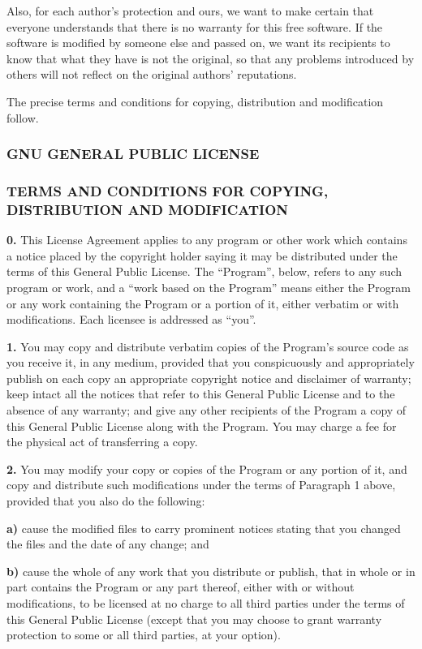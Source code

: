 \documentclass[]{article}
\begin{document}
Also, for each author's protection and ours, we want to make certain
that everyone understands that there is no warranty for this free
software. If the software is modified by someone else and passed on, we
want its recipients to know that what they have is not the original, so
that any problems introduced by others will not reflect on the original
authors' reputations.

The precise terms and conditions for copying, distribution and
modification follow.

\subsubsection{GNU GENERAL PUBLIC LICENSE}

\subsubsection{TERMS AND CONDITIONS FOR COPYING, DISTRIBUTION AND
MODIFICATION}

\textbf{0.} This License Agreement applies to any program or other work
which contains a notice placed by the copyright holder saying it may be
distributed under the terms of this General Public License. The
``Program'', below, refers to any such program or work, and a ``work
based on the Program'' means either the Program or any work containing
the Program or a portion of it, either verbatim or with modifications.
Each licensee is addressed as ``you''.

\textbf{1.} You may copy and distribute verbatim copies of the Program's
source code as you receive it, in any medium, provided that you
conspicuously and appropriately publish on each copy an appropriate
copyright notice and disclaimer of warranty; keep intact all the notices
that refer to this General Public License and to the absence of any
warranty; and give any other recipients of the Program a copy of this
General Public License along with the Program. You may charge a fee for
the physical act of transferring a copy.

\textbf{2.} You may modify your copy or copies of the Program or any
portion of it, and copy and distribute such modifications under the
terms of Paragraph 1 above, provided that you also do the following:

\textbf{a)} cause the modified files to carry prominent notices stating
that you changed the files and the date of any change; and

\textbf{b)} cause the whole of any work that you distribute or publish,
that in whole or in part contains the Program or any part thereof,
either with or without modifications, to be licensed at no charge to all
third parties under the terms of this General Public License (except
that you may choose to grant warranty protection to some or all third
parties, at your option).
\end{document}
